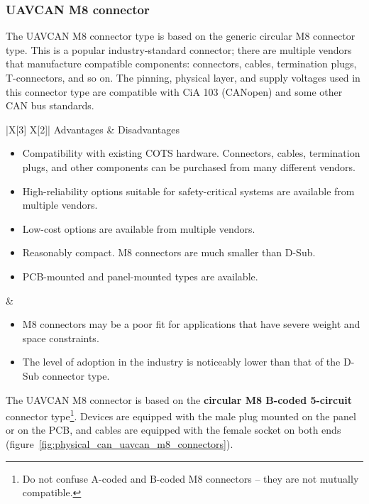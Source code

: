 \clearpage  %
\subsubsection{UAVCAN M8 connector}

The UAVCAN M8 connector type is based on the generic circular M8 connector type.
This is a popular industry-standard connector; there are multiple vendors that manufacture compatible components:
connectors, cables, termination plugs, T-connectors, and so on.
The pinning, physical layer, and supply voltages used in this connector type are compatible with CiA 103 (CANopen)
and some other CAN bus standards.

{
\NoLeftSkip
\begin{UAVCANCompactTable}{|X[3] X[2]|}
    Advantages & Disadvantages \\
    \begin{itemize}
        \item Compatibility with existing COTS hardware.
        Connectors, cables, termination plugs, and other components can be purchased from many different vendors.
        \item High-reliability options suitable for safety-critical systems are available from multiple vendors.
        \item Low-cost options are available from multiple vendors.
        \item Reasonably compact. M8 connectors are much smaller than D-Sub.
        \item PCB-mounted and panel-mounted types are available.
    \end{itemize}
    &
    \begin{itemize}
        \item M8 connectors may be a poor fit for applications that have severe weight and space constraints.
        \item The level of adoption in the industry is noticeably lower than that of the D-Sub connector type.
    \end{itemize}
\end{UAVCANCompactTable}
}

The UAVCAN M8 connector is based on the \textbf{circular M8 B-coded 5-circuit} connector type\footnote{%
    Do not confuse A-coded and B-coded M8 connectors -- they are not mutually compatible.
}.
Devices are equipped with the male plug mounted on the panel or on the PCB,
and cables are equipped with the female socket on both ends (figure~\ref{fig:physical_can_uavcan_m8_connectors}).

